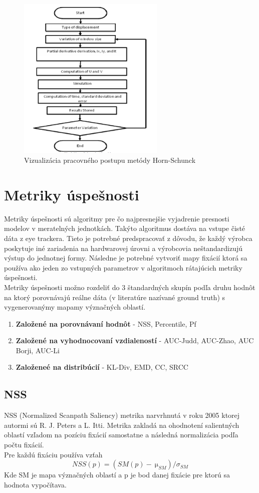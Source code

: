 \begin{figure}[H]
  \centering
  \includegraphics[width=7cm]{pics/horn-schunck.png}
  \caption{Vizualizácia pracovného postupu metódy Horn-Schunck}
\end{figure}
\vspace{10mm}

\section{Metriky úspešnosti}
Metriky úspešnosti sú algoritmy pre čo najpresnejšie vyjadrenie presnosti modelov v meratelných jednotkách.
Takýto algoritmus dostáva na vstupe čisté dáta z eye trackera.
Tieto je potrebné predspracovať z dôvodu, že každý výrobca poskytuje iné zariadenia na hardwarovej úrovni a výrobcovia neštandardizujú výstup do jednotnej formy.
Následne je potrebné vytvoriť mapy fixácií ktorá sa používa ako jeden zo vstupných parametrov v algoritmoch rátajúcich metriky úspešnosti.
\\
Metriky úspešnosti možno rozdeliť do 3 štandardných skupín podľa druhu hodnôt na ktorý porovnávajú reálne dáta (v literatúre nazívané ground truth) s vygenerovanýmy mapamy význačných oblastí\cite{metrics-1}.
\begin{enumerate}
  \item\textbf{Založené na porovnávaní hodnôt} - NSS, Percentile, Pf
  \item\textbf{Založené na vyhodnocovaní vzdialeností} - AUC-Judd, AUC-Zhao, AUC Borji, AUC-Li
  \item\textbf{Založeneé na distribúcií} - KL-Div, EMD, CC, SRCC
\end{enumerate}

\subsection{NSS}
NSS (Normalized Scanpath Saliency) metrika narvrhnutá v roku 2005 ktorej autormi sú R.
J.
Peters a L.
Itti.
Metrika zakladá na ohodnotení salientných oblastí vzľadom na pozíciu fixácií samostatne a následná normalizácia podľa počtu fixácií.
\\
Pre každú fixáciu používa vzťah
  \begin{equation}
    NSS(p) =  (SM(p)-\SI{}{\micro}_{SM}) / 	\sigma_{SM}
  \end{equation}
Kde SM je mapa význačných oblastí a p je bod danej fixácie pre ktorú sa hodnota vypočítava.

